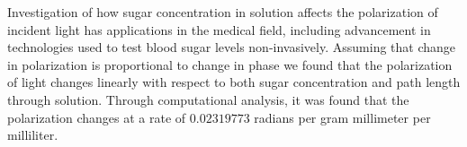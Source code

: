 Investigation of how sugar concentration in solution affects the polarization of incident light has applications in the medical field, including advancement in technologies used to test blood sugar levels non-invasively. Assuming that change in polarization is proportional to change in phase we found that the polarization of light changes linearly with respect to both sugar concentration and path length through solution. Through computational analysis, it was found that the polarization changes at a rate of $0.02319773$ radians per gram millimeter per milliliter.